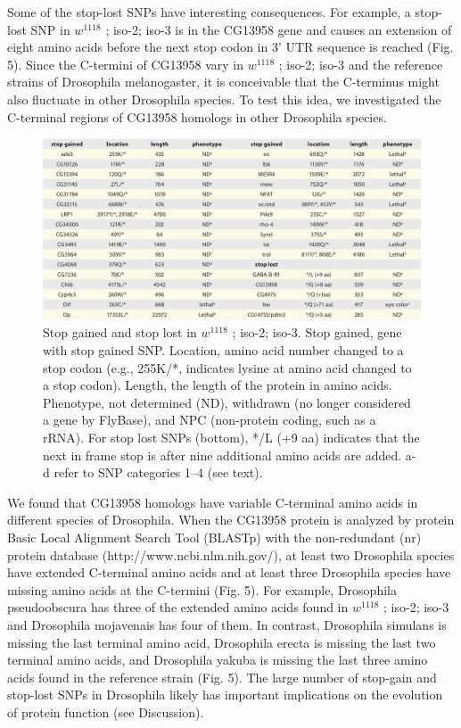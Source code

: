 Some of the stop-lost SNPs have interesting consequences. For example, a stop-lost SNP in $w^{1118}$ ; iso-2; iso-3 is in the CG13958 gene and causes an extension of eight amino acids before the next stop codon in 3' UTR sequence is reached (Fig. 5). Since the C-termini of CG13958 vary in $w^{1118}$ ; iso-2; iso-3 and the reference strains of Drosophila melanogaster, it is conceivable that the C-terminus might also fluctuate in other Drosophila species. To test this idea, we investigated the C-terminal regions of CG13958 homologs in other Drosophila species.

\begin{figure}
    \centering
    \includegraphics[width=14cm]{snpeff_table7.png}
    \caption{Stop gained and stop lost in $w^{1118}$ ; iso-2; iso-3. Stop gained, gene with stop gained SNP. Location, amino acid number changed to a stop codon (e.g., 255K/*, indicates lysine at amino acid changed to a stop codon). Length, the length of the protein in amino acids. Phenotype, not determined (ND), withdrawn (no longer considered a gene by FlyBase), and NPC (non-protein coding, such as a rRNA). For stop lost SNPs (bottom), */L (+9 aa) indicates that the next in frame stop is after nine additional amino acids are added. a-d refer to SNP categories 1–4 (see text).}
    \label{fig:snpeffTab3}
\end{figure}

We found that CG13958 homologs have variable C-terminal amino acids in different species of Drosophila. When the CG13958 protein is analyzed by protein Basic Local Alignment Search Tool (BLASTp) with the non-redundant (nr) protein database (http://www.ncbi.nlm.nih.gov/), at least two Drosophila species have extended C-terminal amino acids and at least three Drosophila species have missing amino acids at the C-termini (Fig. 5). For example, Drosophila pseudoobscura has three of the extended amino acids found in $w^{1118}$ ; iso-2; iso-3 and Drosophila mojavenais has four of them. In contrast, Drosophila simulans is missing the last terminal amino acid, Drosophila erecta is missing the last two terminal amino acids, and Drosophila yakuba is missing the last three amino acids found in the reference strain (Fig. 5). The large number of stop-gain and stop-lost SNPs in Drosophila likely has important implications on the evolution of protein function (see Discussion).

